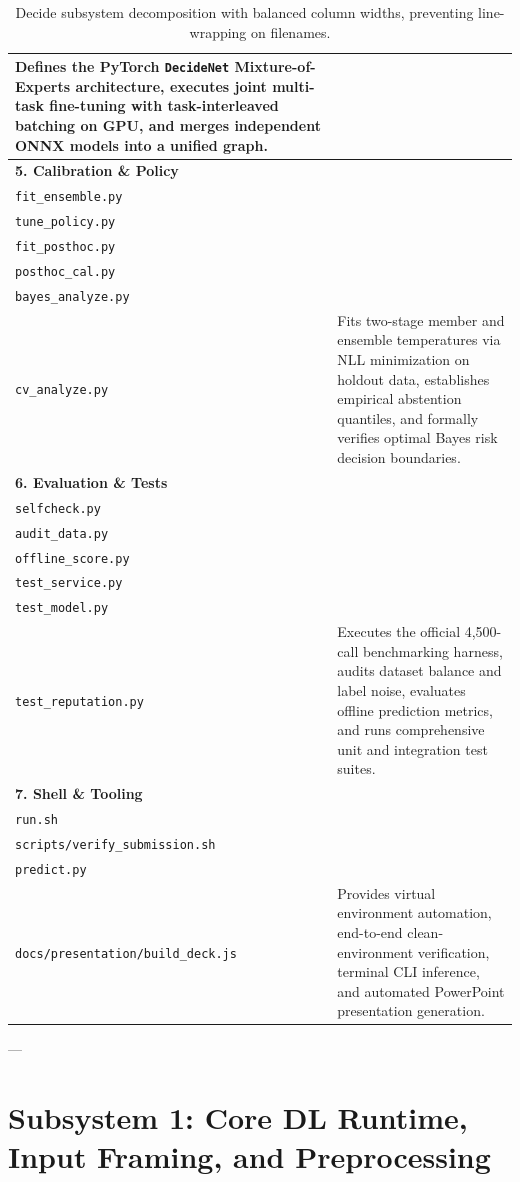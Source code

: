 \documentclass[11pt,a4paper]{article}
\begin{document}
\begin{table}[htbp]
\begin{tabularx}{\linewidth}{>{\raggedright\arraybackslash}p{4.6cm} >{\raggedright\arraybackslash}X}
Defines the PyTorch \texttt{DecideNet} Mixture-of-Experts architecture, executes joint multi-task fine-tuning with task-interleaved batching on GPU, and merges independent ONNX models into a unified graph.\\
\midrule
\textbf{5. Calibration \& Policy}\\[1pt]
\texttt{fit\_ensemble.py}\\\texttt{tune\_policy.py}\\\texttt{fit\_posthoc.py}\\\texttt{posthoc\_cal.py}\\\texttt{bayes\_analyze.py}\\\texttt{cv\_analyze.py} &
Fits two-stage member and ensemble temperatures via NLL minimization on holdout data, establishes empirical abstention quantiles, and formally verifies optimal Bayes risk decision boundaries.\\
\midrule
\textbf{6. Evaluation \& Tests}\\[1pt]
\texttt{selfcheck.py}\\\texttt{audit\_data.py}\\\texttt{offline\_score.py}\\\texttt{test\_service.py}\\\texttt{test\_model.py}\\\texttt{test\_reputation.py} &
Executes the official 4,500-call benchmarking harness, audits dataset balance and label noise, evaluates offline prediction metrics, and runs comprehensive unit and integration test suites.\\
\midrule
\textbf{7. Shell \& Tooling}\\[1pt]
\texttt{run.sh}\\\texttt{scripts/verify\_submission.sh}\\\texttt{predict.py}\\\texttt{docs/presentation/build\_deck.js} &
Provides virtual environment automation, end-to-end clean-environment verification, terminal CLI inference, and automated PowerPoint presentation generation.\\
\bottomrule
\end{tabularx}
\caption{Decide subsystem decomposition with balanced column widths, preventing line-wrapping on filenames.}
\label{tab:subsystems_clean}
\end{table}

---

\section{Subsystem 1: Core DL Runtime, Input Framing, and Preprocessing}
\end{document}

